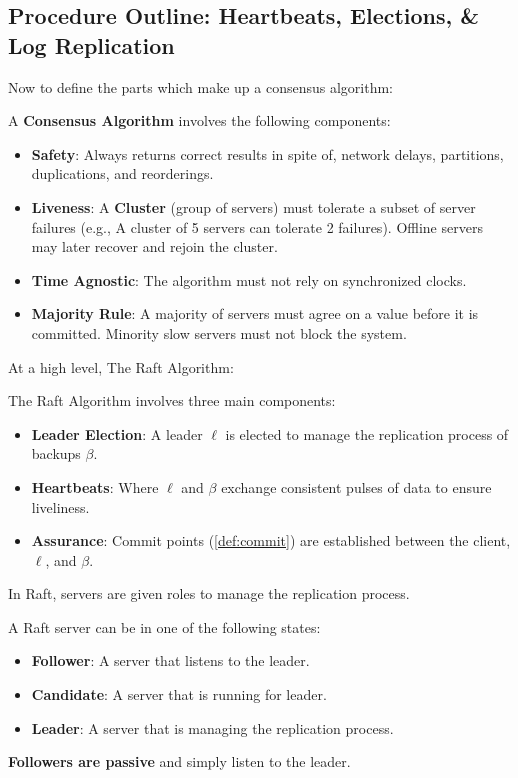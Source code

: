 \subsection{Procedure Outline: Heartbeats, Elections, \& Log Replication}
\noindent
Now to define the parts which make up a consensus algorithm:
\begin{Def}

    A \textbf{Consensus Algorithm} involves the following components:
    \begin{itemize}
        \item \textbf{Safety}: Always returns correct results in spite of, network delays, partitions, duplications, and reorderings.
        \item \textbf{Liveness}: A \textbf{Cluster} (group of servers) must tolerate a subset of server failures (e.g., A cluster of 5 servers can tolerate 2 failures). Offline 
        servers may later recover and rejoin the cluster.
        \item \textbf{Time Agnostic}: The algorithm must not rely on synchronized clocks.
        \item \textbf{Majority Rule}: A majority of servers must agree on a value before it is committed. Minority slow servers must not block the system.
    \end{itemize}
\end{Def}

\noindent
At a high level, The Raft Algorithm:
\begin{Def}

    The Raft Algorithm involves three main components:
    \begin{itemize}
        \item \textbf{Leader Election}: A leader $\ell$ is elected to manage the replication process of backups $\beta$.
        \item \textbf{Heartbeats}: Where $\ell$ and $\beta$ exchange consistent pulses of data to ensure liveliness.
        \item \textbf{Assurance}: Commit points (\ref{def:commit}) are established between the client, $\ell$, and $\beta$. 
    \end{itemize}
\end{Def}
\noindent
In Raft, servers are given roles to manage the replication process.
\begin{Def}

    A Raft server can be in one of the following states:
    \begin{itemize}
        \item \textbf{Follower}: A server that listens to the leader.
        \item \textbf{Candidate}: A server that is running for leader.
        \item \textbf{Leader}: A server that is managing the replication process.
    \end{itemize}
    \textbf{Followers are passive} and simply listen to the leader.
\end{Def}

